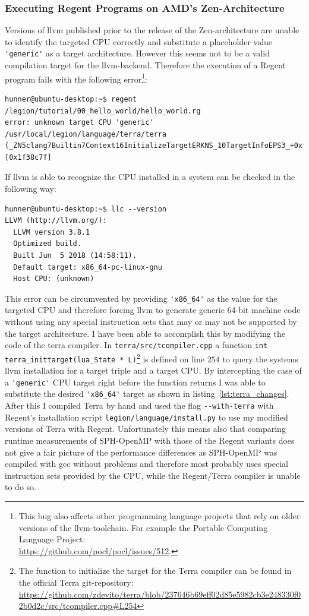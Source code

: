 \documentclass{article}      %
\begin{document}
\subsubsection{Executing Regent Programs on AMD's Zen-Architecture}\label{sec:zen}
Versions of llvm published prior to the release of the Zen-architecture are unable to identify the targeted CPU correctly and substitute a placeholder value \lstinline{'generic'} as a target architecture. However this seems not to be a valid compilation target for the llvm-backend. Therefore the execution of a Regent program fails with the following error\footnote{This bug also affects other programming language projects that rely on older versions of the llvm-toolchain. For example the Portable Computing Language Project:\\\url{https://github.com/pocl/pocl/issues/512}.}:
\begin{lstlisting}[numbers=none,frame=single,deletekeywords={local}]
hunner@ubuntu-desktop:~$ regent /legion/tutorial/00_hello_world/hello_world.rg 
error: unknown target CPU 'generic'
/usr/local/legion/language/terra/terra
(_ZN5clang7Builtin7Context16InitializeTargetERKNS_10TargetInfoEPS3_+0xf) [0x1f38c7f]
\end{lstlisting}
If llvm is able to recognize the CPU installed in a system can be checked in the following way:
\begin{lstlisting}[numbers=none,frame=single]
hunner@ubuntu-desktop:~$ llc --version
LLVM (http://llvm.org/):
  LLVM version 3.8.1
  Optimized build.
  Built Jun  5 2018 (14:58:11).
  Default target: x86_64-pc-linux-gnu
  Host CPU: (unknown)
\end{lstlisting}
This error can be circumvented by providing \lstinline{'x86_64'} as the value for the targeted CPU and therefore forcing llvm to generate generic 64-bit machine code without using any special instruction sets that may or may not be supported by the target architecture. I have been able to accomplish this by modifying the code of the terra compiler. In \lstinline{terra/src/tcompiler.cpp} a function \lstinline{int terra_inittarget(lua_State * L)}\footnote{The function to initialize the target for the Terra compiler can be found in the official Terra git-repository: 
\url{https://github.com/zdevito/terra/blob/237646b69eff02d85e5982cb3e248330f02b0d2c/src/tcompiler.cpp\#L254}
} 
is defined on line $254$ to query the systems llvm installation for a target triple and a target CPU. By intercepting the case of a \lstinline{'generic'} CPU target right before the function returns I was able to substitute the desired \lstinline{'x86_64'} target as shown in listing~\ref{lst:terra_changes}. After this I compiled Terra by hand and used the flag \lstinline{--with-terra} with Regent's installation script \lstinline{legion/language/install.py} to use my modified versions of Terra with Regent. Unfortunately this means also that comparing runtime measurements of SPH-OpenMP with those of the Regent variants does not give a fair picture of the performance differences as SPH-OpenMP was compiled with gcc without problems and therefore most probably uses special instruction sets provided by the CPU, while the Regent/Terra compiler is unable to do so.
\end{document}
